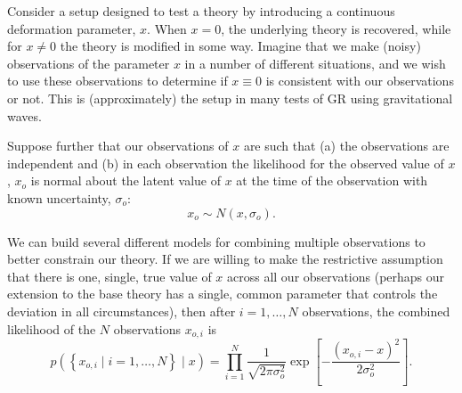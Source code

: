 \documentclass[modern]{aastex631}
\begin{document}
Consider a setup designed to test a theory by introducing a continuous
deformation parameter, $x$.  When $x=0$, the underlying theory is recovered,
while for $x \neq 0$ the theory is modified in some way.  Imagine that we make
(noisy) observations of the parameter $x$ in a number of different situations,
and we wish to use these observations to determine if $x\equiv 0$ is consistent
with our observations or not.  This is (approximately) the setup in many tests of GR using gravitational waves.  

Suppose further that our observations of $x$ are such that (a) the observations
are independent and (b) in each observation the likelihood for the observed
value of $x$, $x_o$ is normal about the latent value of $x$ at the time of the
observation with known uncertainty, $\sigma_o$:
\begin{equation}
    x_o \sim N\left(x, \sigma_o \right).
\end{equation}

We can build several different models for combining multiple observations to
better constrain our theory.  If we are willing to make the restrictive
assumption that there is one, single, true value of $x$ across all our
observations (perhaps our extension to the base theory has a single, common
parameter that controls the deviation in all circumstances), then after $i = 1,
\ldots, N$ observations, the combined likelihood of the $N$ observations
$x_{o,i}$ is 
\begin{equation}
    \label{eq:fixed-x-likelihood}
    p\left( \left\{ x_{o,i} \mid i = 1, \ldots, N \right\} \mid x \right) = \prod_{i=1}^N \frac{1}{\sqrt{2 \pi \sigma_o^2}} \exp\left[-\frac{\left( x_{o,i} - x \right)^2}{2 \sigma_o^2} \right].
\end{equation}
\end{document}
